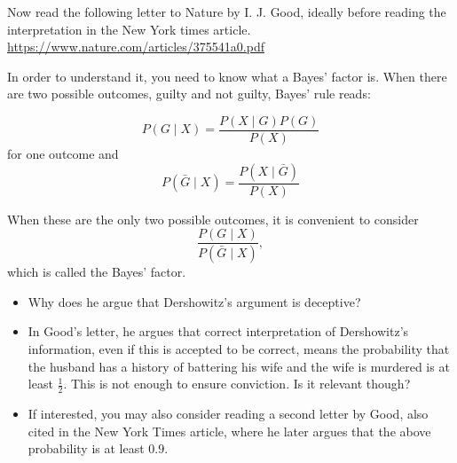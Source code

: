 \documentclass[a4wide]{article}
\begin{document}
Now read the following letter to Nature by I. J. Good, ideally before
reading the interpretation in the New York times article.
\url{https://www.nature.com/articles/375541a0.pdf}

In order to understand it,
you need to know what a Bayes' factor is. When there are two possible
outcomes, guilty and not guilty, Bayes' rule reads:

$$
P(G \mid X ) = \frac{P(X \mid G)P(G)}{P(X)}
$$
for one outcome and
$$
P(\bar{G} \mid X) = \frac{P( X \mid \bar{G})}{P(X)}
$$

When these are the only two possible outcomes, it is convenient to consider
$$
\frac{P(G \mid X)}{P(\bar{G} \mid X)},
$$
  which is called the Bayes' factor.
  

\begin{itemize}
  
\item Why does he argue that Dershowitz's argument is deceptive?

\item In Good's letter, he argues that correct interpretation of Dershowitz's
  information, even if this is accepted to be correct, means the probability that
  the husband has a history of battering his wife and the wife is murdered is at least
  $\frac{1}{2}$. This is not enough to ensure conviction. Is it relevant though?

\item If interested, you may also consider reading a second letter by Good, also cited
  in the New York Times article, where he later argues that the above probability is
  at least $0.9$.

\end{itemize}

\end{document}
